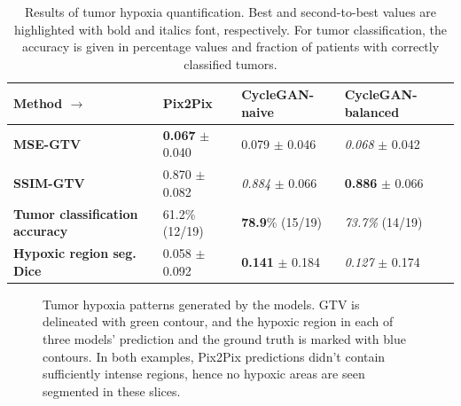 \begin{table}[h!]
    \footnotesize
    \centering
    \begin{tabular}{l || lll}
         \textbf{Method} $\rightarrow$                & Pix2Pix                       & CycleGAN-naive                & CycleGAN-balanced              \\
         \hline
         \textbf{MSE-GTV}                             & \textbf{0.067} $\pm$ 0.040    & 0.079 $\pm$ 0.046             & \textit{0.068} $\pm$ 0.042     \\
         \textbf{SSIM-GTV}                            & 0.870 $\pm$ 0.082             & \textit{0.884} $\pm$ 0.066    & \textbf{0.886} $\pm$ 0.066     \\
         \textbf{Tumor classification accuracy}       & 61.2\% (12/19)                & \textbf{78.9}\% (15/19)       & \textit{73.7\%} (14/19)        \\
         \textbf{Hypoxic region seg. Dice}    & 0.058 $\pm$ 0.092             & \textbf{0.141} $\pm$ 0.184    &  \textit{0.127} $\pm$ 0.174    \\
    \end{tabular}
    \caption{Results of tumor hypoxia quantification. Best and second-to-best values are highlighted with bold and italics font, respectively. For tumor classification, the accuracy is given in percentage values and fraction of patients with correctly classified tumors.}
    \label{tab:hypoxia_metrics}
\end{table}



\begin{figure}[h!]
    \centering
    \caption{Tumor hypoxia patterns generated by the models. GTV is delineated with green contour, and the hypoxic region in each of three models' prediction and the ground truth is marked with blue contours. In both examples, Pix2Pix predictions didn't contain sufficiently intense regions, hence no hypoxic areas are seen segmented in these slices.}
    \label{fig:hypoxia_viz}
\end{figure}


